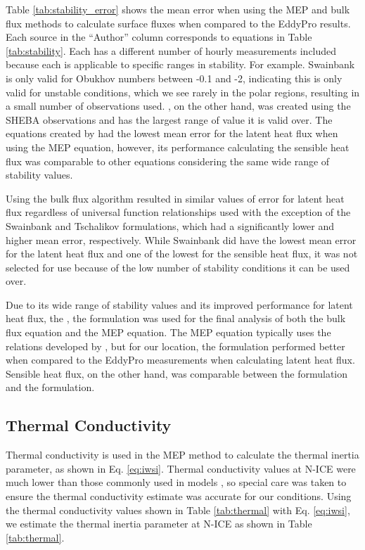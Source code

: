   Table \ref{tab:stability_error} shows the mean error when using the MEP and bulk flux methods to calculate surface fluxes when compared to the EddyPro results. Each source in the ``Author'' column corresponds to equations in Table \ref{tab:stability}. Each has a different number of hourly measurements included because each is applicable to specific ranges in stability. For example. Swainbank \citep{foken:2008} is only valid for Obukhov numbers between -0.1 and -2, indicating this is only valid for unstable conditions, which we see rarely in the polar regions, resulting in a small number of observations used. \citet{andreas:311}, on the other hand, was created using the SHEBA observations and has the largest range of value it is valid over. The equations created by \citet{andreas:311} had the lowest mean error for the latent heat flux when using the MEP equation, however, its performance calculating the sensible heat flux was comparable to other equations considering the same wide range of stability values. 

Using the bulk flux algorithm resulted in similar values of error for latent heat flux regardless of universal function relationships used with the exception of the Swainbank and Tschalikov \citep{foken:2008} formulations, which had a significantly lower and higher mean error, respectively. While Swainbank \citep{foken:2008} did have the lowest mean error for the latent heat flux and one of the lowest for the sensible heat flux, it was not selected for use because of the low number of stability conditions it can be used over.  

Due to its wide range of stability values and its improved performance for latent heat flux, the \citet{andreas:2010}, the formulation was used for the final analysis of both the bulk flux equation and the MEP equation. The MEP equation typically uses the relations developed by \citet{businger:1971}, but for our location, the \citet{andreas:311} formulation performed better when compared to the EddyPro measurements when calculating latent heat flux. Sensible heat flux, on the other hand, was comparable between the  \citet{andreas:311} formulation and the \citet{businger:1971} formulation. 


\subsection{Thermal Conductivity}
Thermal conductivity is used in the MEP method to calculate the thermal inertia parameter, as shown in Eq. \ref{eq:iwsi}. Thermal conductivity values at N-ICE were much lower than those commonly used in models \citep{merkouriadi:2017}, so special care was taken to ensure the thermal conductivity estimate was accurate for our conditions. Using the thermal conductivity values shown in  Table \ref{tab:thermal} with Eq. \ref{eq:iwsi}, we estimate the thermal inertia parameter at N-ICE as shown in  Table \ref{tab:thermal}. 

